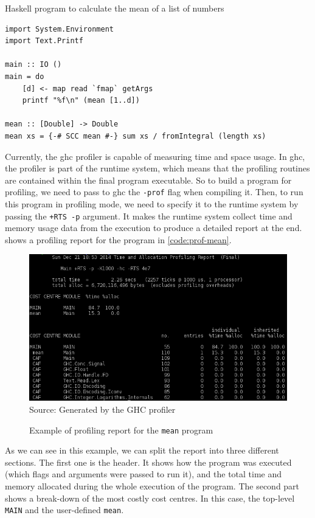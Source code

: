 \begin{listing}
  \caption{Haskell program to calculate the mean of a list of numbers}
  \begin{verbatim}
import System.Environment
import Text.Printf

main :: IO ()
main = do
    [d] <- map read `fmap` getArgs
    printf "%f\n" (mean [1..d])

mean :: [Double] -> Double
mean xs = {-# SCC mean #-} sum xs / fromIntegral (length xs)
  \end{verbatim}
  \label{code:prof-mean}
\end{listing}

Currently, the \ac{ghc} profiler is capable of measuring time and space usage. In \ac{ghc}, the profiler is part of the runtime system, which means that the profiling routines are contained within the final program executable. So to build a program for profiling, we need to pass to \ac{ghc} the \texttt{-prof} flag when compiling it. Then, to run this program in profiling mode, we need to specify it to the runtime system by passing the \texttt{+RTS -p} argument. It makes the runtime system collect time and memory usage data from the execution to produce a detailed report at the end.  shows a profiling report for the program in \autoref{code:prof-mean}.

\begin{figure}[htp]
  \centering
  \caption{Example of profiling report for the \texttt{mean} program}
  \includegraphics[width=\columnwidth]{images/profiler-placeholder}
  \footnotesize{Source: Generated by the GHC profiler}
  \label{fig:profiler-sample}
\end{figure}

As we can see in this example, we can split the report into three different sections. The first one is the header. It shows how the program was executed (which flags and arguments were passed to run it), and the total time and memory allocated during the whole execution of the program. The second part shows a break-down of the most costly cost centres. In this case, the top-level \texttt{MAIN} and the user-defined \texttt{mean}.


